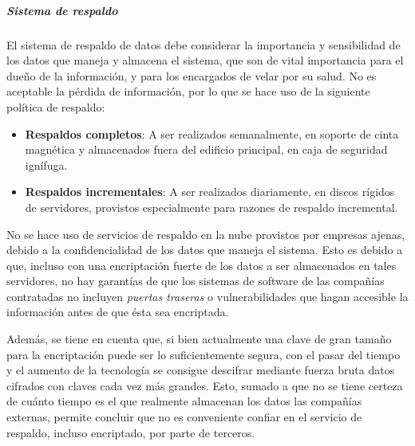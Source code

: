 

\subparagraph{Sistema de respaldo}
    
    El sistema de respaldo de datos debe considerar la importancia y sensibilidad de los datos que maneja y almacena el sistema, que son de vital importancia para el dueño de la información, y para los encargados de velar por su salud.
    No es aceptable la pérdida de información, por lo que se hace uso de la siguiente política de respaldo:
    
    \begin{itemize}
        \item \textbf{Respaldos completos}:
        A ser realizados semanalmente, en soporte de cinta magnética y almacenados fuera del edificio principal, en caja de seguridad ignífuga.
        
        \item \textbf{Respaldos incrementales}:
        A ser realizados diariamente, en discos rígidos de servidores, provistos especialmente para razones de respaldo incremental. 
    \end{itemize}
    
    No se hace uso de servicios de respaldo en la nube provistos por empresas ajenas, debido a la confidencialidad de los datos que maneja el sistema.
    Esto es debido a que, incluso con una encriptación fuerte de los datos a ser almacenados en tales servidores, no hay garantías de que los sistemas de software de las compañías contratadas no incluyen \textit{puertas traseras} o vulnerabilidades que hagan accesible la información antes de que ésta sea encriptada.
    
    Además, se tiene en cuenta que, si bien actualmente una clave de gran tamaño para la encriptación puede ser lo suficientemente segura, con el pasar del tiempo y el aumento de la tecnología se consigue descifrar mediante fuerza bruta datos cifrados con claves cada vez más grandes.
    Esto, sumado a que no se tiene certeza de cuánto tiempo es el que realmente almacenan los datos las compañías externas, permite concluir que no es conveniente confiar en el servicio de respaldo, incluso encriptado, por parte de terceros.
    
